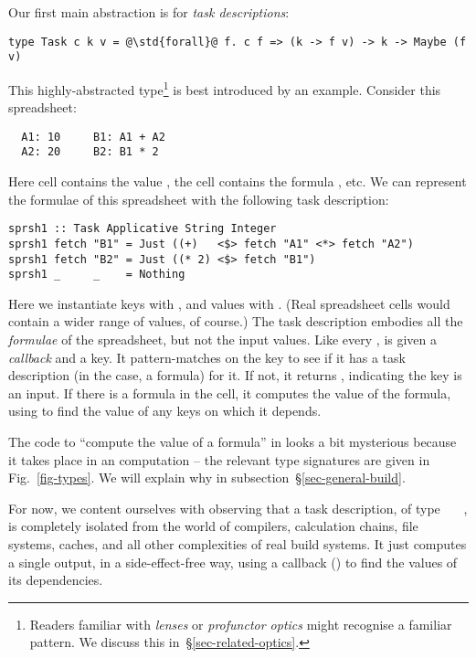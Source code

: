 Our first main abstraction is for \emph{task descriptions}:
\begin{verbatim}
type Task c k v = @\std{forall}@ f. c f => (k -> f v) -> k -> Maybe (f v)
\end{verbatim}
This highly-abstracted type\footnote{Readers familiar with \emph{lenses} or
\emph{profunctor optics} might recognise a familiar pattern. We discuss this
in~\S\ref{sec-related-optics}.} is best introduced by an example.
Consider this \Excel spreadsheet:
\vspace{1mm}
\begin{verbatim}
  A1: 10     B1: A1 + A2
  A2: 20     B2: B1 * 2
\end{verbatim}
\vspace{1mm}
Here cell  contains the value , the cell  contains
the formula , etc. We can represent the formulae of this spreadsheet
with the following task description:
\vspace{1mm}
\begin{verbatim}
sprsh1 :: Task Applicative String Integer
sprsh1 fetch "B1" = Just ((+)   <$> fetch "A1" <*> fetch "A2")
sprsh1 fetch "B2" = Just ((* 2) <$> fetch "B1")
sprsh1 _     _    = Nothing
\end{verbatim}
\vspace{1mm}
Here we instantiate keys  with , and values  with .
(Real spreadsheet cells would contain a wider range of values, of course.)
The task description  embodies all the \emph{formulae} of the spreadsheet,
but not the input values.  Like every ,  is given a
\emph{callback}  and a key. It pattern-matches on the key to see if it
has a task description (in the \Excel case, a formula) for it. If not, it returns
, indicating the key is an input. If there is a formula in the cell,
it computes the value of the formula, using  to find the value of any
keys on which it depends.

The code to ``compute the value of a formula'' in  looks a bit mysterious
because it takes place in an  computation \cite{mcbride2008applicative}
-- the relevant type signatures are given in Fig.~\ref{fig-types}. We will
explain why in subsection~\S\ref{sec-general-build}.

For now, we content ourselves with observing that a task description,
of type ~~~, is completely isolated from the world of
compilers, calculation chains, file systems, caches, and all other
complexities of real build systems.  It just computes a single output, in
a side-effect-free way, using a callback () to find the values
of its dependencies.

